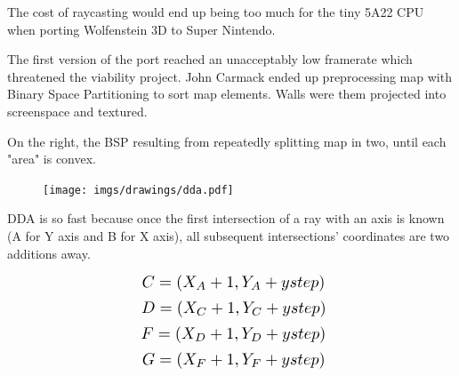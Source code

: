 \begin{figure} 
\vspace{-10pt}
\end{figure} 
 The cost of raycasting would end up being too much for the tiny 5A22 CPU when porting Wolfenstein 3D to Super Nintendo.\\
\par
 The first version of the port reached an unacceptably low framerate which threatened the viability project. John Carmack ended up preprocessing map with Binary Space Partitioning to sort map elements. Walls were them projected into screenspace and textured.\\
 \par
 On the right, the BSP resulting from repeatedly splitting map  in two, until each "area" is convex.

 




\begin{figure}[H]
  \centering
 \texttt{[image: imgs/drawings/dda.pdf]}
\end{figure}
\par


DDA is so fast because once the first intersection of a ray with an axis is known (A for Y axis and B for X axis), all subsequent intersections' coordinates are two additions away.
\par


\begin{equation*}
    \scalebox{1.3}{
$C = (X_{A} +1, Y_{A} + ystep)$\\
}
\end{equation*}
\begin{equation*}
    \scalebox{1.3}{
$D = (X_{C} +1, Y_{C} + ystep)$\\
}
\end{equation*}
\begin{equation*}
    \scalebox{1.3}{
$F = (X_{D} +1, Y_{D} + ystep)$\\
}
\end{equation*}
\begin{equation*}
    \scalebox{1.3}{
$G = (X_{F} +1, Y_{F} + ystep)$\\
}
\end{equation*}


